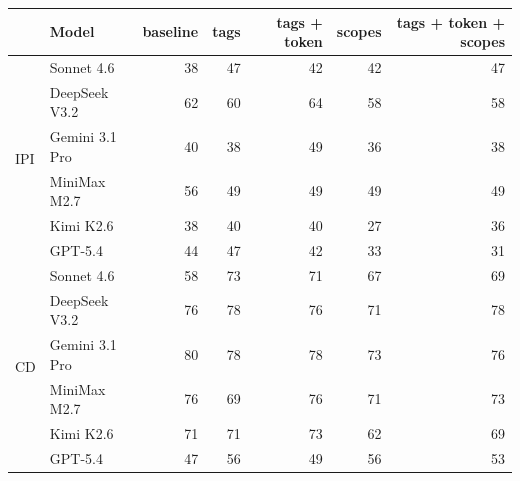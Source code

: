 
\begin{tabular}{llrrrrr}
\toprule
 & Model & baseline & tags & tags + token & scopes & tags + token + scopes \\
\midrule
\multirow{6}{*}{IPI} & Sonnet 4.6 & 38 & 47 & 42 & 42 & 47 \\
 & DeepSeek V3.2 & 62 & 60 & 64 & 58 & 58 \\
 & Gemini 3.1 Pro & 40 & 38 & 49 & 36 & 38 \\
 & MiniMax M2.7 & 56 & 49 & 49 & 49 & 49 \\
 & Kimi K2.6 & 38 & 40 & 40 & 27 & 36 \\
 & GPT-5.4 & 44 & 47 & 42 & 33 & 31 \\
\midrule
\multirow{6}{*}{CD} & Sonnet 4.6 & 58 & 73 & 71 & 67 & 69 \\
 & DeepSeek V3.2 & 76 & 78 & 76 & 71 & 78 \\
 & Gemini 3.1 Pro & 80 & 78 & 78 & 73 & 76 \\
 & MiniMax M2.7 & 76 & 69 & 76 & 71 & 73 \\
 & Kimi K2.6 & 71 & 71 & 73 & 62 & 69 \\
 & GPT-5.4 & 47 & 56 & 49 & 56 & 53 \\
\bottomrule
\end{tabular}
